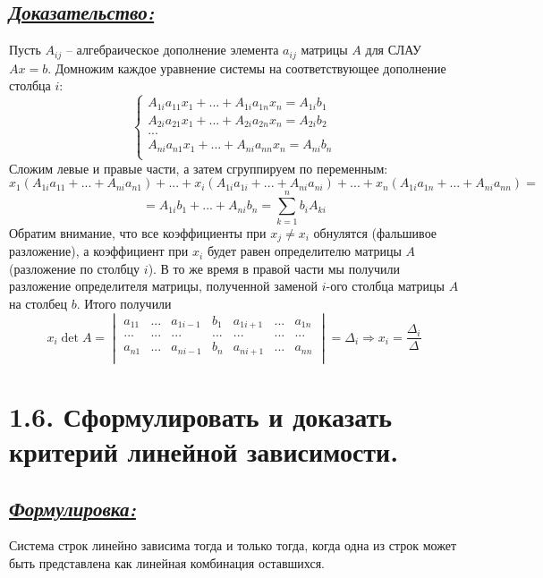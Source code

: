 \documentclass{article}
\begin{document}
\subsection*{\Large \underline{\textit{Доказательство: }}}
Пусть $A_{ij}$ -- алгебраическое дополнение элемента $a_{ij}$ матрицы $A$ для СЛАУ $Ax = b$. Домножим каждое уравнение системы на соответствующее дополнение столбца $i$:
$$
\begin{cases}
A_{1i}a_{11}x_1 + ... + A_{1i}a_{1n}x_n = A_{1i}b_1 \\
A_{2i}a_{21}x_1 + ... + A_{2i}a_{2n}x_n = A_{2i}b_2 \\
... \\
A_{ni}a_{n1}x_1 + ... + A_{ni}a_{nn}x_n = A_{ni}b_n \\
\end{cases}
$$
Сложим левые и правые части, а затем сгруппируем по переменным:
$$
x_1(A_{1i}a_{11} + ... + A_{ni}a_{n1}) + ... + x_i(A_{1i}a_{1i} + ... + A_{ni}a_{ni}) + ... + x_n(A_{1i}a_{1n} + ... + A_{ni}a_{nn}) =
$$
$$
= A_{1i}b_1 + ... + A_{ni}b_n = \sum_{k = 1}^{n}b_iA_{ki}
$$
Обратим внимание, что все коэффициенты при $x_j \ne x_i$ обнулятся (фальшивое разложение), а коэффициент при $x_i$ будет равен определителю матрицы $A$ (разложение по столбцу $i$). В то же время в правой части мы получили разложение определителя матрицы, полученной заменой $i$-ого столбца матрицы $A$ на столбец $b$. Итого получили 
$$
x_i \det{A} =
\begin{vmatrix}
a_{11} & ... & a_{1i-1} & b_1 & a_{1i+1} & ... & a_{1n} \\
... & ... & ... & ... & ... & ... & ... \\
a_{n1} & ... & a_{ni-1} & b_n & a_{ni+1} & ... & a_{nn} \\
\end{vmatrix}
= \Delta_i \Rightarrow x_i = \frac{\Delta_i}{\Delta}
$$

\section*{\LARGE 1.6. Сформулировать и доказать критерий линейной зависимости. }
\subsection*{\Large \underline{\textit{Формулировка: }}}
Система строк линейно зависима тогда и только тогда, когда одна из строк может быть представлена как линейная комбинация оставшихся.
\end{document}
